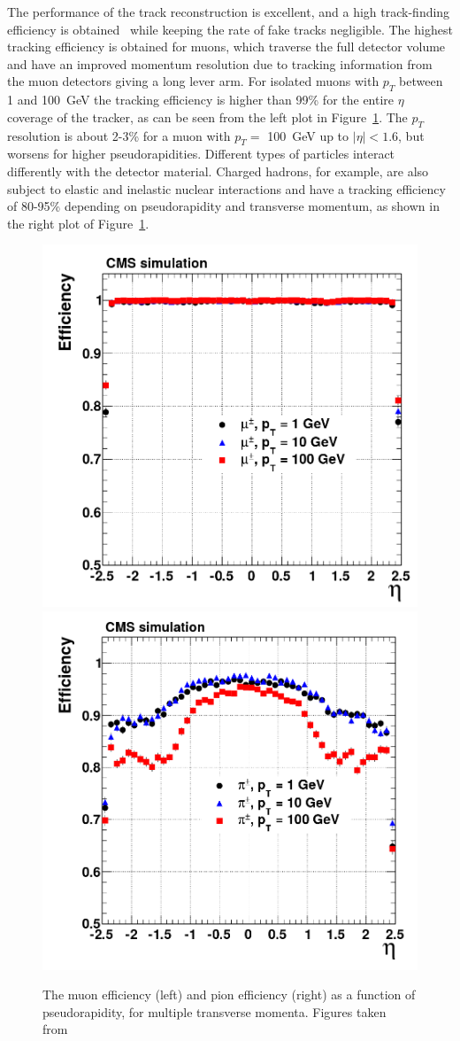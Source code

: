 The performance of the track reconstruction is excellent, and a high track-finding efficiency is obtained~\cite{Chatrchyan:2014fea} while keeping the rate of fake tracks negligible. The highest tracking efficiency is obtained for muons, which traverse the full detector volume and have an improved momentum resolution due to tracking information from the muon detectors giving a long lever arm. For isolated muons with $p_T$ between 1 and \SI{100}{GeV} the tracking efficiency is higher than 99\% for the entire $\eta$ coverage of the tracker, as can be seen from the left plot in Figure~\ref{fig:eff_eta}. The $p_T$ resolution is about 2-3\% for a muon with $p_T = $ \SI{100}{GeV} up to $|\eta| < 1.6$, but worsens for higher pseudorapidities. Different types of particles interact differently with the detector material. Charged hadrons, for example, are also subject to elastic and inelastic nuclear interactions and have a tracking efficiency of 80-95\% depending on pseudorapidity and transverse momentum, as shown in the right plot of Figure~\ref{fig:eff_eta}.

\begin{figure}[ht]
  \centering
\includegraphics[width=.4\textwidth]{muon_eff_eta}\hspace{1cm}
 \includegraphics[width=.4\textwidth]{pion_eff_eta} 
 \caption{The muon efficiency (left) and pion efficiency (right) as a function of pseudorapidity, for multiple transverse momenta. Figures taken from~\cite{Chatrchyan:2014fea}}
 \label{fig:eff_eta}
\end{figure}

